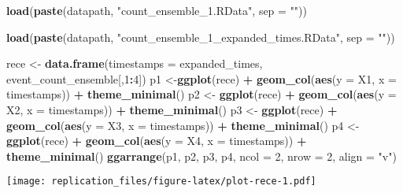 \documentclass[]{article}
\newenvironment{Shaded}{\begin{snugshade}}{\end{snugshade}}
\newcommand{\KeywordTok}[1]{\textcolor[rgb]{0.13,0.29,0.53}{\textbf{#1}}}
\newcommand{\DataTypeTok}[1]{\textcolor[rgb]{0.13,0.29,0.53}{#1}}
\newcommand{\DecValTok}[1]{\textcolor[rgb]{0.00,0.00,0.81}{#1}}
\newcommand{\StringTok}[1]{\textcolor[rgb]{0.31,0.60,0.02}{#1}}
\newcommand{\OperatorTok}[1]{\textcolor[rgb]{0.81,0.36,0.00}{\textbf{#1}}}
\newcommand{\NormalTok}[1]{#1}
\begin{document}
\begin{Shaded}
\begin{Highlighting}[]
\KeywordTok{load}\NormalTok{(}\KeywordTok{paste}\NormalTok{(datapath,}
            \StringTok{"count_ensemble_1.RData"}\NormalTok{,}
            \DataTypeTok{sep =} \StringTok{""}\NormalTok{))}

\KeywordTok{load}\NormalTok{(}\KeywordTok{paste}\NormalTok{(datapath,}
            \StringTok{"count_ensemble_1_expanded_times.RData"}\NormalTok{,}
            \DataTypeTok{sep =} \StringTok{""}\NormalTok{))}

\NormalTok{rece <-}\StringTok{ }\KeywordTok{data.frame}\NormalTok{(}\DataTypeTok{timestamps =}\NormalTok{ expanded_times,}
\NormalTok{                    event_count_ensemble[,}\DecValTok{1}\OperatorTok{:}\DecValTok{4}\NormalTok{])}
\NormalTok{p1 <-}\KeywordTok{ggplot}\NormalTok{(rece) }\OperatorTok{+}
\StringTok{            }\KeywordTok{geom_col}\NormalTok{(}\KeywordTok{aes}\NormalTok{(}\DataTypeTok{y =}\NormalTok{ X1, }\DataTypeTok{x =}\NormalTok{ timestamps)) }\OperatorTok{+}
\StringTok{            }\KeywordTok{theme_minimal}\NormalTok{()}
\NormalTok{p2 <-}\StringTok{ }\KeywordTok{ggplot}\NormalTok{(rece) }\OperatorTok{+}
\StringTok{            }\KeywordTok{geom_col}\NormalTok{(}\KeywordTok{aes}\NormalTok{(}\DataTypeTok{y =}\NormalTok{ X2, }\DataTypeTok{x =}\NormalTok{ timestamps)) }\OperatorTok{+}
\StringTok{            }\KeywordTok{theme_minimal}\NormalTok{()}
\NormalTok{p3 <-}\StringTok{ }\KeywordTok{ggplot}\NormalTok{(rece) }\OperatorTok{+}
\StringTok{            }\KeywordTok{geom_col}\NormalTok{(}\KeywordTok{aes}\NormalTok{(}\DataTypeTok{y =}\NormalTok{ X3, }\DataTypeTok{x =}\NormalTok{ timestamps)) }\OperatorTok{+}
\StringTok{            }\KeywordTok{theme_minimal}\NormalTok{()}
\NormalTok{p4 <-}\StringTok{ }\KeywordTok{ggplot}\NormalTok{(rece) }\OperatorTok{+}
\StringTok{            }\KeywordTok{geom_col}\NormalTok{(}\KeywordTok{aes}\NormalTok{(}\DataTypeTok{y =}\NormalTok{ X4, }\DataTypeTok{x =}\NormalTok{ timestamps)) }\OperatorTok{+}
\StringTok{            }\KeywordTok{theme_minimal}\NormalTok{()}
\KeywordTok{ggarrange}\NormalTok{(p1,}
\NormalTok{        p2,}
\NormalTok{        p3,}
\NormalTok{        p4,}
        \DataTypeTok{ncol =} \DecValTok{2}\NormalTok{,}
        \DataTypeTok{nrow =} \DecValTok{2}\NormalTok{,}
        \DataTypeTok{align =} \StringTok{"v"}\NormalTok{)}
\end{Highlighting}
\end{Shaded}

\texttt{[image: replication\_files/figure-latex/plot-rece-1.pdf]}
\end{document}
